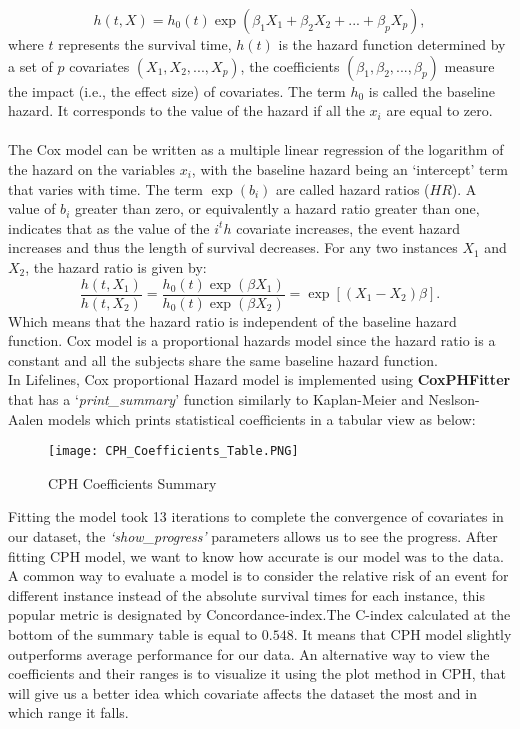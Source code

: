 \documentclass[10pt,twocolumn]{article}
\begin{document}
\begin{equation}
h(t, X) = h_0(t)\exp(\beta_1 X_1 + \beta_2 X_2 + ...+\beta_p X_p ), 
\end{equation}
where $t$ represents the survival time, $h(t)$ is the hazard function determined by a set of $p$ covariates $(X_1,X_2,...,X_p)$, the coefficients $(\beta_1,\beta_2,...,\beta_p)$ measure the impact (i.e., the effect size) of covariates. The term $h_0$ is called the baseline hazard. It corresponds to the value of the hazard if all the $x_i$ are equal to zero.\\
\\The Cox model can be written as a multiple linear regression of the logarithm of the hazard on the variables $x_i$, with the baseline hazard being an ‘intercept’ term that varies with time. The term $\exp(b_i)$ are called hazard ratios ($HR$). A value of $b_i$ greater than zero, or equivalently a hazard ratio greater than one, indicates that as the value of the $i^th$ covariate increases, the event hazard increases and thus the length of survival decreases.  For any two instances $X_1$ and $X_2$, the hazard ratio is given by:
\begin{equation}
\dfrac{h(t,X_1)}{h(t,X_2)} = \dfrac{h_0(t)\exp(\beta X_1)}{h_0(t)\exp(\beta X_2)} = \exp[(X_1 - X_2)\beta].
\end{equation}
Which means that the hazard ratio is independent of the baseline hazard function. Cox model is a proportional hazards model since the hazard ratio is a constant and all the subjects share the same baseline hazard function.\\
In Lifelines, Cox proportional Hazard model is implemented using \textbf{CoxPHFitter} that has a `\textit{print\_summary}' function similarly to Kaplan-Meier and Neslson-Aalen models which prints statistical coefficients in a tabular view as below:

\begin{figure}[!htb]
\centering
\texttt{[image: CPH\_Coefficients\_Table.PNG]}
\caption{CPH Coefficients Summary}
\label{Fig:CPH_Coefficients_Table}
\end{figure} 
Fitting the model took 13 iterations to complete the convergence of covariates in our dataset, the \textit{`show\_progress'} parameters allows us to see the progress. After fitting CPH model, we want to know how accurate is our model was to the data. A common way to evaluate a model is to consider the relative risk of an event for different instance instead of the absolute survival times for each instance, this popular metric is designated by Concordance-index.The C-index calculated at the bottom of the summary table is equal to $0.548$. It means that CPH model slightly outperforms average performance for our data. An alternative way to view the coefficients and their ranges is to visualize it using the plot method in CPH, that will give us a better idea which covariate affects the dataset the most and in which range it falls.\\
\end{document}
